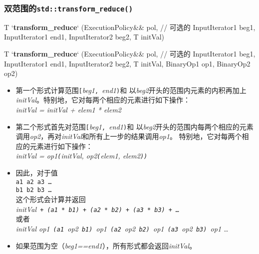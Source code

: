 \subsubsection{双范围的\texttt{std::transform\_reduce()}}\label{ch23.2.2.2}
\begin{algolisting}
T
`\textbf{transform\_reduce}` (ExecutionPolicy&& pol,    // 可选的
                  InputIterator1 beg1, InputIterator1 end1,
                  InputIterator2 beg2,
                  T initVal)

T
`\textbf{transform\_reduce}` (ExecutionPolicy&& pol,    // 可选的
                  InputIterator1 beg1, InputIterator1 end1,
                  InputIterator2 beg2,
                  T initVal,
                  BinaryOp1 op1, BinaryOp2 op2)
\end{algolisting}
\begin{itemize}
    \item 第一个形式计算范围\texttt{[}\emph{beg1}\texttt{, }\emph{end1}\texttt{)}和
    以\emph{beg2}开头的范围内元素的内积再加上\emph{initVal}。特别地，它对每两个相应的元素进行如下操作：\\
    \hspace*{2em}\emph{initVal = initVal + elem1 * elem2}
    \item 第二个形式首先对范围\texttt{[}\emph{beg1}\texttt{, }\emph{end1}\texttt{)}和
    以\emph{beg2}开头的范围内每两个相应的元素调用\emph{op2}，再对\emph{initVal}和所有上一步的结果调用\emph{op1}。
    特别地，它对每两个相应的元素进行如下操作：\\
    \hspace*{2em}\emph{initVal = op1\texttt{(}initVal, op2\texttt{(}elem1, elem2\texttt{))}}
    \item 因此，对于值\\
    \hspace*{2em}\texttt{a1 a2 a3 \ldots}\\
    \hspace*{2em}\texttt{b1 b2 b3 \ldots}\\
    这个形式会计算并返回\\
    \hspace*{2em}\emph{initVal\texttt{ + (a1 * b1) + (a2 * b2) + (a3 * b3) + \ldots}}\\
    或者\\
    \hspace*{2em}\emph{initVal op1\texttt{ (a1 }op2\texttt{ b1) }op1\texttt{ (a2 }op2\texttt{ b2) }op1\texttt{ (a3 }op2\texttt{ b3) }op1 \ldots}
    \item 如果范围为空（\emph{beg1==end1}），所有形式都会返回\emph{initVal}。

\end{itemize}
